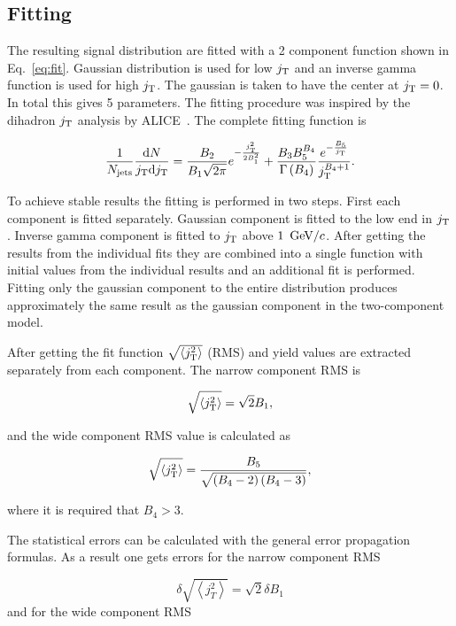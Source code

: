  \subsection{Fitting}


The resulting signal distribution are fitted with a 2 component function shown in Eq.~\ref{eq:fit}. Gaussian distribution is used for low $j_{\rm T}$ and an inverse gamma function is used for high $j_{\rm T}$. The gaussian is taken to have the center at $j_{\rm T} = 0$. In total this gives 5 parameters. The fitting procedure was inspired by the dihadron $j_{\rm T}$ analysis by ALICE~\cite{ALICEjt}. The complete fitting function is 

\begin{equation}
\frac{1}{N_{\mathrm{jets}}}\frac{\mathrm{d}N}{j_{\rm T} \mathrm{d}j_{\rm T}} = \frac{B_2}{B_1\sqrt{2\pi}}e^{-\frac{j_{\rm T}^2}{2B_1^2}}+\frac{B_3B_5^{B_4}}{\Gamma\left(B_4\right)}\frac{e^{-\frac{B_5}{j_{\rm T}}}}{j_{\rm T}^{B_4+1}}.
\label{eq:fit}
\end{equation}

To achieve stable results the fitting is performed in two steps. First each component is fitted separately. Gaussian component is fitted to the low end in $j_{\rm T}$. Inverse gamma component is fitted to $j_{\rm T}$ above $\unit[1]{\gevc}$. After getting the results from the individual fits they are combined into a single function with initial values from the individual results and an additional fit is performed. Fitting only the gaussian component to the entire distribution produces approximately the same result as the gaussian component in the two-component model.

After getting the fit function $\sqrt{\left<j_{\rm T}^2\right>}$ (RMS) and yield values are extracted separately from each component. The narrow component RMS is

$$\sqrt{\left<j_{\rm T}^2\right>}=\sqrt{2}B_1,$$

and the wide component RMS value is calculated as 

$$\sqrt{\left<j_{\rm T}^2\right>}=\frac{B_5}{\sqrt{\left(B_4-2\right)\left(B_4-3\right)}},$$

where it is required that $B_4 > 3$.

The statistical errors can be calculated with the general error propagation formulas. As a result one gets errors for the narrow component RMS


\begin{equation}
\delta \sqrt{\left<j_T^2\right>} = \sqrt{2}\delta B_1
\end{equation}
and for the wide component RMS

